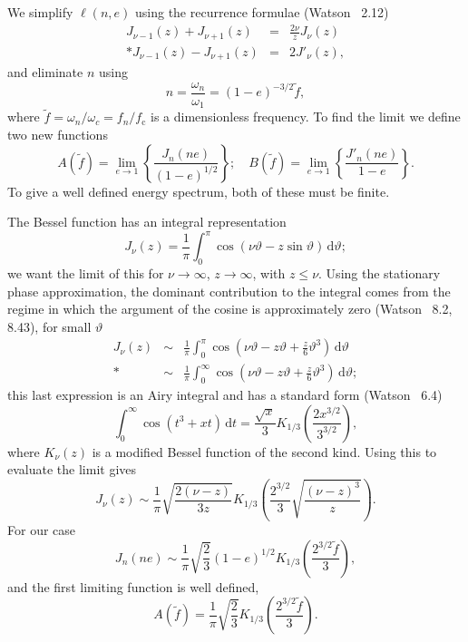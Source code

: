 \documentclass[aps,prd,amsfonts,amssymb,amsmath,nofootinbib,floatfix,reprint,showpacs,groupedaddress]{revtex4-1}
\newcommand{\sub}[1]{\ensuremath{_\text{#1}}}
\newcommand{\dd}{\ensuremath{\mathrm{d}}}
\newcommand{\intd}[4]{\ensuremath{\int_{#1}^{#2}{#3}\,\dd{#4}}}
\newcommand{\recip}[1]{\ensuremath{\frac{1}{#1}}}
\begin{document}
We simplify $\ell(n,e)$ using the recurrence formulae (Watson~\cite{Watson1995} 2.12)
\begin{eqnarray}
J_{\nu-1}(z) + J_{\nu+1}(z) & = & \frac{2\nu}{z}J_\nu(z)\\*
J_{\nu-1}(z) - J_{\nu+1}(z) & = & 2J'_\nu(z),\label{eq:J_derivative}
\end{eqnarray}
and eliminate $n$ using
\begin{equation}
n = \frac{\omega_n}{\omega_1} = (1-e)^{-3/2}\tilde{f},
\end{equation}
where $\tilde{f} = \omega_n/\omega_{c} = f_n/f\sub{c}$ is a dimensionless frequency. To find the limit we define two new functions
\begin{equation}
A(\tilde{f}) = \lim_{e\rightarrow 1}\left\{\frac{J_n(ne)}{(1-e)^{1/2}}\right\}; \quad B(\tilde{f}) = \lim_{e\rightarrow 1}\left\{\frac{J'_n(ne)}{1-e}\right\}.
\end{equation}
To give a well defined energy spectrum, both of these must be finite.

The Bessel function has an integral representation
\begin{equation}
J_\nu(z) = \recip{\pi}\intd{0}{\pi}{\cos(\nu\vartheta - z\sin\vartheta)}{\vartheta};
\end{equation}
we want the limit of this for $\nu \rightarrow \infty$, $z \rightarrow \infty$, with $z \leq \nu$. Using the stationary phase approximation, the dominant contribution to the integral comes from the regime in which the argument of the cosine is approximately zero (Watson~\cite{Watson1995} 8.2, 8.43), for small $\vartheta$
\begin{eqnarray}
J_\nu(z) & \sim & \recip{\pi}\intd{0}{\pi}{\cos\left(\nu\vartheta - z\vartheta + \frac{z}{6}\vartheta^3\right)}{\vartheta}\\*
 & \sim & \recip{\pi}\intd{0}{\infty}{\cos\left(\nu\vartheta - z\vartheta + \frac{z}{6}\vartheta^3\right)}{\vartheta};
\end{eqnarray}
this last expression is an Airy integral and has a standard form (Watson~\cite{Watson1995} 6.4)
\begin{equation}
\intd{0}{\infty}{\cos(t^3 + xt)}{t} = \frac{\sqrt{x}}{3}K_{1/3}\left(\frac{2x^{3/2}}{3^{3/2}}\right),
\end{equation}
where $K_\nu(z)$ is a modified Bessel function of the second kind. Using this to evaluate the limit gives
\begin{equation}
J_\nu(z) \sim \recip{\pi}\sqrt{\frac{2(\nu - z)}{3z}}K_{1/3}\left(\frac{2^{3/2}}{3}\sqrt{\frac{(\nu -z)^3}{z}}\right).
\label{eq:J_nu}
\end{equation}
For our case
\begin{equation}
J_n(ne) \sim \recip{\pi}\sqrt{\frac{2}{3}}(1-e)^{1/2}K_{1/3}\left(\frac{2^{3/2}\tilde{f}}{3}\right),
\end{equation}
and the first limiting function is well defined,
\begin{equation}
A(\tilde{f}) = \recip{\pi}\sqrt{\frac{2}{3}}K_{1/3}\left(\frac{2^{3/2}\tilde{f}}{3}\right).
\end{equation}
\end{document}
